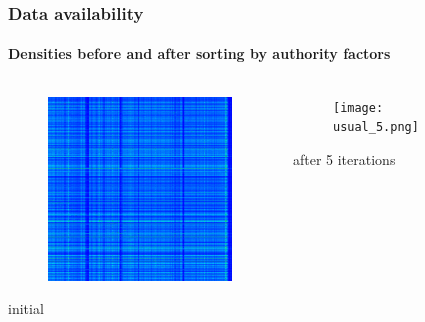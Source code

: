 \documentclass{beamer}
\begin{document}
\begin{frame}
\frametitle{Data availability}
\framesubtitle{Densities before and after sorting by authority factors}
\begin{columns}[T] %
\begin{column}{.48\textwidth}
\begin{figure}[h] 
    \includegraphics[width=5cm]{usual_0.png}
\end{figure}
initial
\end{column}%
\hfill%
\begin{column}{.48\textwidth}
\begin{figure}[h] 
    \texttt{[image: usual\_5.png]}
\end{figure}
after 5 iterations
\end{column}%
\end{columns}
\end{frame}
\end{document}
